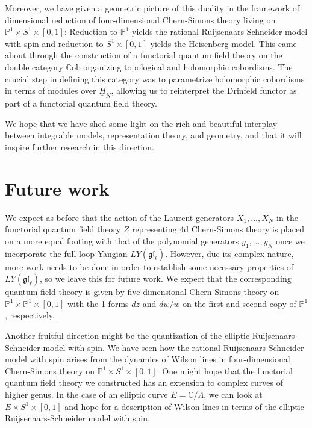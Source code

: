 \documentclass[11pt]{report}
\theoremstyle{definition}
\theoremstyle{remark}
\theoremstyle{remark}
\newcommand{\C}{\mathbb{C}}
\renewcommand{\P}{\mathbb{P}}
\begin{document}
Moreover, we have given a geometric picture of this duality in the framework of dimensional reduction of four-dimensional Chern-Simons theory living on $\P^1 \times S^1 \times [0,1]$: Reduction to $\P^1$ yields the rational Ruijsenaars-Schneider model with spin and reduction to $S^1 \times [0,1]$ yields the Heisenberg model. This came about through the construction of a functorial quantum field theory on the double category $\mathbb{C}\text{ob}$ organizing topological and holomorphic cobordisms. The crucial step in defining this category was to parametrize holomorphic cobordisms in terms of modules over $\underline{\dot H}_N$, allowing us to reinterpret the Drinfeld functor as part of a functorial quantum field theory.

We hope that we have shed some light on the rich and beautiful interplay between integrable models, representation theory, and geometry, and that it will inspire further research in this direction.

\section*{Future work}

We expect as before that the action of the Laurent generators $X_1,...,X_N$ in the functorial quantum field theory $Z$ representing 4d Chern-Simons theory is placed on a more equal footing with that of the polynomial generators $y_1,...,y_N$ once we incorporate the full loop Yangian $LY(\mathfrak{gl}_\ell)$. However, due its complex nature, more work needs to be done in order to establish some necessary properties of $LY(\mathfrak{gl}_\ell)$, so we leave this for future work. We expect that the corresponding quantum field theory is given by five-dimensional Chern-Simons theory on $\P^1 \times \P^1 \times [0,1]$ with the 1-forms $dz$ and $dw/w$ on the first and second copy of $\P^1$, respectively.

Another fruitful direction might be the quantization of the elliptic Ruijsenaars-Schneider model with spin. We have seen how the rational Ruijsenaars-Schneider model with spin arises from the dynamics of Wilson lines in four-dimensional Chern-Simons theory on $\P^1 \times S^1 \times [0,1]$. One might hope that the functorial quantum field theory we constructed has an extension to complex curves of higher genus. In the case of an elliptic curve $E = \C/\Lambda$, we can look at $E \times S^1 \times [0,1]$ and hope for a description of Wilson lines in terms of the elliptic Ruijsenaars-Schneider model with spin.
\end{document}
